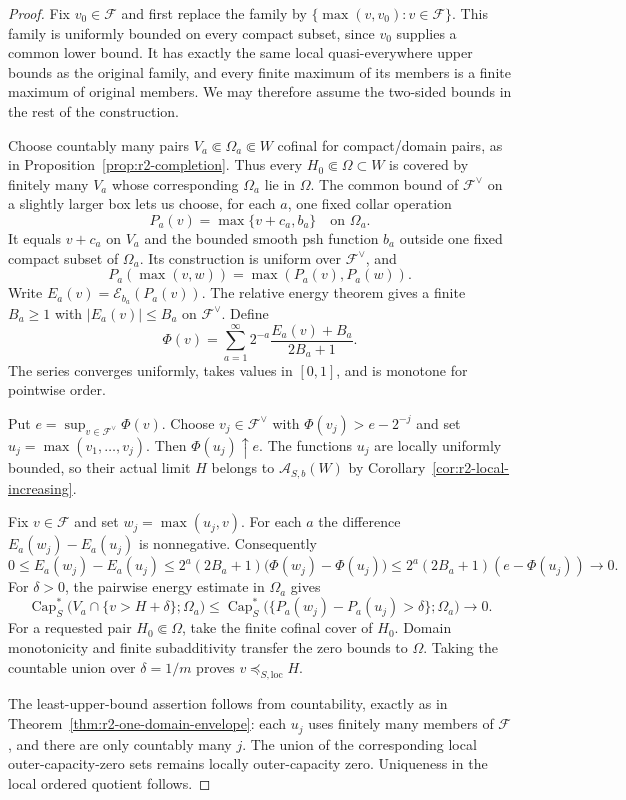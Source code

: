 \documentclass[11pt,a4paper]{article}
\numberwithin{equation}{section}
\theoremstyle{definition}
\theoremstyle{remark}
\begin{document}
\begin{proof}
Fix $v_0\in\mathcal F$ and first replace the family by
$\{\max(v,v_0):v\in\mathcal F\}$. This family is uniformly
bounded on every compact subset, since $v_0$ supplies a common
lower bound. It has exactly the same local quasi-everywhere upper
bounds as the original family, and every finite maximum of its
members is a finite maximum of original members. We may therefore
assume the two-sided bounds in the rest of the construction.

Choose countably many pairs $V_a\Subset\Omega_a\Subset W$
cofinal for compact/domain pairs, as in
Proposition~\ref{prop:r2-completion}. Thus every
$H_0\Subset\Omega\subset W$ is covered by finitely many $V_a$
whose corresponding $\Omega_a$ lie in $\Omega$.
The common bound of $\mathcal F^\vee$ on a slightly larger box
lets us choose, for each $a$, one fixed collar operation
\[
 P_a(v)=\max\{v+c_a,b_a\}\quad\text{on }\Omega_a.
\]
It equals $v+c_a$ on $V_a$ and the bounded smooth psh function
$b_a$ outside one fixed compact subset of $\Omega_a$.
Its construction is uniform over $\mathcal F^\vee$, and
\[
 P_a(\max(v,w))=\max(P_a(v),P_a(w)).
\]
Write $E_a(v)=\mathcal E_{b_a}(P_a(v))$. The relative energy
theorem gives a finite $B_a\geq1$ with $|E_a(v)|\leq B_a$ on
$\mathcal F^\vee$. Define
\[
 \Phi(v)=\sum_{a=1}^{\infty}2^{-a}
             \frac{E_a(v)+B_a}{2B_a+1}.
\]
The series converges uniformly, takes values in $[0,1]$, and is
monotone for pointwise order.

Put $e=\sup_{v\in\mathcal F^\vee}\Phi(v)$. Choose
$v_j\in\mathcal F^\vee$ with $\Phi(v_j)>e-2^{-j}$ and set
$u_j=\max(v_1,\ldots,v_j)$. Then $\Phi(u_j)\uparrow e$.
The functions $u_j$ are locally uniformly bounded, so their
actual limit $H$ belongs to $\mathcal A_{S,b}(W)$ by
Corollary~\ref{cor:r2-local-increasing}.

Fix $v\in\mathcal F$ and set $w_j=\max(u_j,v)$. For each $a$
the difference $E_a(w_j)-E_a(u_j)$ is nonnegative. Consequently
\[
 0\leq E_a(w_j)-E_a(u_j)
 \leq 2^a(2B_a+1)\bigl(\Phi(w_j)-\Phi(u_j)\bigr)
 \leq 2^a(2B_a+1)(e-\Phi(u_j))\longrightarrow0.
\]
For $\delta>0$, the pairwise energy estimate in $\Omega_a$ gives
\[
 \operatorname{Cap}_S^*\bigl(V_a\cap\{v>H+\delta\};\Omega_a\bigr)
 \leq\operatorname{Cap}_S^*\bigl(
       \{P_a(w_j)-P_a(u_j)>\delta\};\Omega_a\bigr)
       \longrightarrow0.
\]
For a requested pair $H_0\Subset\Omega$, take the finite cofinal
cover of $H_0$. Domain monotonicity and finite subadditivity
transfer the zero bounds to $\Omega$. Taking the countable
union over $\delta=1/m$ proves
$v\preceq_{S,\mathrm{loc}}H$.

The least-upper-bound assertion follows from countability,
exactly as in Theorem~\ref{thm:r2-one-domain-envelope}: each
$u_j$ uses finitely many members of $\mathcal F$, and there
are only countably many $j$. The union of the corresponding
local outer-capacity-zero sets remains locally outer-capacity
zero. Uniqueness in the local ordered quotient follows.
\end{proof}
\end{document}
